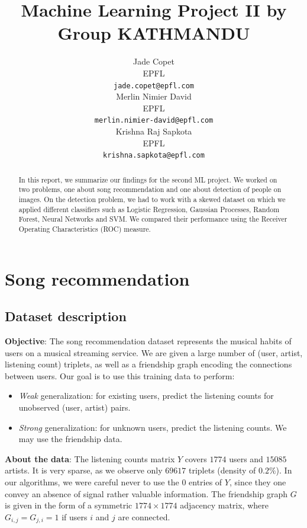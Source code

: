 \documentclass[10pt,a4paper]{article}
\title{Machine Learning Project II by Group KATHMANDU}
\author{
  Jade Copet\\
  EPFL \\
  \texttt{jade.copet@epfl.com} \\
  \And
  Merlin Nimier David\\
  EPFL \\
  \texttt{merlin.nimier-david@epfl.com} \\
  \And
  Krishna Raj Sapkota\\
  EPFL \\
  \texttt{krishna.sapkota@epfl.com} \\
}
\begin{document}
\maketitle



\begin{abstract}
 In this report, we summarize our findings for the second ML project. We worked on two problems, one about song recommendation and one about detection of people on images. On the detection problem, we had to work with a skewed dataset on which we applied different classifiers such as Logistic Regression, Gaussian Processes, Random Forest, Neural Networks and SVM. We compared their performance using the Receiver Operating Characteristics (ROC) measure.
\end{abstract}

\section{Song recommendation}

  \subsection{Dataset description}
  \textbf{Objective}: The song recommendation dataset represents the musical habits of users on a musical streaming service. We are given a large number of (user, artist, listening count) triplets, as well as a friendship graph encoding the connections between users. Our goal is to use this training data to perform:

  \begin{itemize}
    \item \textit{Weak} generalization: for existing users, predict the listening counts for unobserved (user, artist) pairs.
    \item \textit{Strong} generalization: for unknown users, predict the listening counts. We may use the friendship data.
  \end{itemize}

  \textbf{About the data}: The listening counts matrix $Y$ covers $1774$ users and $15085$ artists. It is very sparse, as we observe only $69617$ triplets (density of $0.2\%$). In our algorithms, we were careful never to use the $0$ entries of $Y$, since they one convey an absence of signal rather valuable information. The friendship graph $G$ is given in the form of a symmetric $1774 \times 1774$ adjacency matrix, where $G_{i, j} = G_{j, i} = 1$ if users $i$ and $j$ are connected.\\
\end{document}
